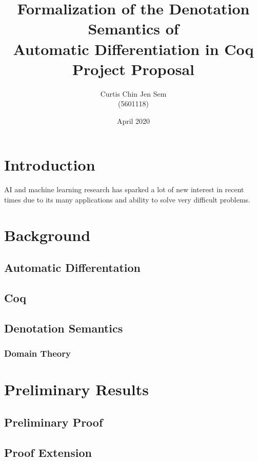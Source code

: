\documentclass[11pt, letterpaper]{article}
\title{Formalization of the Denotation Semantics of
    \\ Automatic Differentiation in Coq
    \\ Project Proposal
}
\author{Curtis Chin Jen Sem \\ (5601118)}
\date{April 2020}
\begin{document}
\maketitle

\section{Introduction}

AI and machine learning research has sparked a lot of new interest in recent times due to its many applications and ability to solve very difficult problems.




\section{Background}

\subsection{Automatic Differentation}

\subsection{Coq}

\subsection{Denotation Semantics}

\subsubsection{Domain Theory}

\section{Preliminary Results}

\subsection{Preliminary Proof}

\subsection{Proof Extension}
\end{document}
